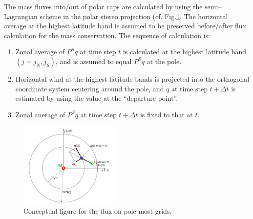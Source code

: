 The mass fluxes into/out of polar caps are calculated by using the semi--Lagrangian scheme in the polar stereo projection (cf. Fig.\ref{f2}. The horizontal average at the highest
latitude band is assumed to be preserved before/after flux calculation for the mass conservation. The sequence of calculation is:

\begin{enumerate}
\def\labelenumi{\arabic{enumi}.}
\item
  Zonal average of \(P^{S}q\) at time step \(t\) is calculated at the highest latitude band \((j=j_{N},j_{S})\), and is assumed to equal \(P^{S}q\) at the pole.
\item
  Horizontal wind at the highest latitude bands is projected into the orthogonal coordinate system centering around the pole, and \(q\) at time step \(t + \Delta t\) is estimated by using the value at
  the ``departure point''.
\item
  Zonal anerage of \(P^{S}q\) at time step \(t+\Delta t\) is fixed to that at \(t\).
\end{enumerate}

\begin{figure}
\hypertarget{f2}{%
\centering
\includegraphics[width=5cm,height=\textheight]{../figures/polar_tracer_advection.png}
\caption{Conceptual figure for the flux on pole-most grids.}\label{f2}
}
\end{figure}
